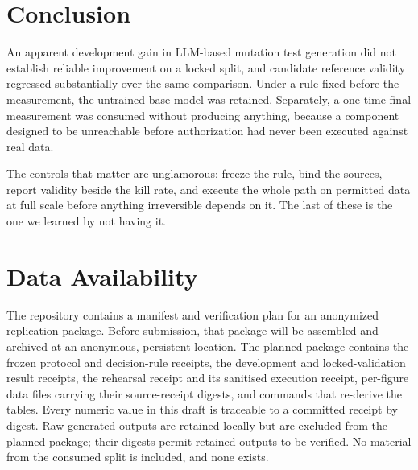 \documentclass[10pt,conference]{IEEEtran}
\begin{document}
\section{Conclusion}

An apparent development gain in LLM-based mutation test generation did not
establish reliable improvement on a locked split, and candidate reference
validity regressed substantially over the same comparison. Under a rule fixed
before the measurement, the untrained base model was retained. Separately, a
one-time final measurement was consumed without producing anything, because a
component designed to be unreachable before authorization had never been
executed against real data.

The controls that matter are unglamorous: freeze the rule, bind the sources,
report validity beside the kill rate, and execute the whole path on permitted
data at full scale before anything irreversible depends on it. The last of these
is the one we learned by not having it.

\section*{Data Availability}

The repository contains a manifest and verification plan for an anonymized
replication package. Before submission, that package will be assembled and
archived at an anonymous, persistent location. The planned package contains the
frozen protocol and decision-rule receipts, the development and
locked-validation result receipts, the rehearsal receipt and its sanitised
execution receipt, per-figure data files carrying their source-receipt digests,
and commands that re-derive the tables. Every numeric value in this draft is
traceable to a committed receipt by digest. Raw generated outputs are retained
locally but are excluded from the planned package; their digests permit retained
outputs to be verified. No material from the consumed split is included, and
none exists.



\end{document}
